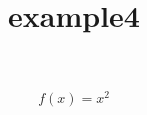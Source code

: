 \documentclass{book}
\title{example4}
\begin{document}
\begin{equation}
				f(x) = x^2
\end{equation}
\end{document}
